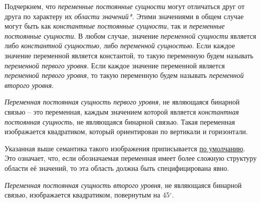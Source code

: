 \begin{SCn}
{Подчеркнем, что \textit{переменные постоянные сущности} могут отличаться друг от друга по характеру их \textit{области значений*}. Этими значениями в общем случае могут быть как \textit{константные постоянные сущности}, так и \textit{переменные постоянные сущности}. В любом случае, значение \textit{переменной сущности} является либо \textit{константной сущностью}, либо \textit{переменной сущностью}. Если каждое значение переменной является константой, то такую переменную будем называть \textit{переменной первого уровня}. Если каждое значение переменной является \textit{переменной первого уровня}, то такую переменную будем называть \textit{переменной второго уровня}. 

\textit{Переменная постоянная сущность первого уровня}, не являющаяся бинарной связью -- это переменная, каждым значением которой является \textit{константная постоянная сущность}, не являющаяся бинарной связью. Такая переменная изображается квадратиком, который ориентирован по вертикали и горизонтали. 

Указанная выше семантика такого изображения приписывается \uline{по умолчанию}. Это означает, что, если обозначаемая переменная имеет более сложную структуру области её значений, то эта область должна быть специфицирована явно. 

\textit{Переменная постоянная сущность второго уровня}, не являющаяся бинарной связью, изображается квадратиком, повернутым на 45$^\circ$.}



\end{SCn}
